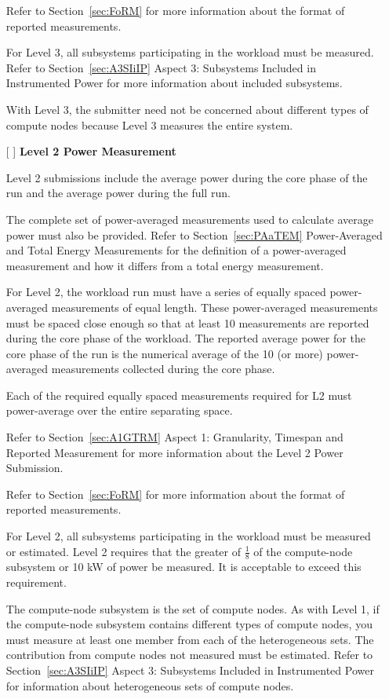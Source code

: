 \begin{itemize}
Refer to Section~\ref{sec:FoRM} for more information about the format of reported measurements.

For Level 3, all subsystems participating in the workload must be measured. Refer to 
Section~\ref{sec:A3SIiIP} Aspect 3: Subsystems Included in Instrumented Power for more information about included subsystems.

With Level 3, the submitter need not be concerned about different types of compute nodes because Level 3 measures the entire system.

\newpage
\item[{[ ]}]
\textbf{Level 2 Power Measurement}

Level 2 submissions include the average power during the core phase of the run and the average power during the full run.

The complete set of power-averaged measurements used to calculate average power must also be provided. 
Refer to Section~\ref{sec:PAaTEM} Power-Averaged and Total Energy Measurements for the definition of a power-averaged measurement and how it differs from a total energy measurement.

For Level 2, the workload run must have a series of equally spaced power-averaged measurements of equal length. These power-averaged measurements must be spaced close enough so that at least 10 measurements are reported during the core phase of the workload. The reported average power for the core phase of the run is the numerical average of the 10 (or more) power-averaged measurements collected during the core phase.

Each of the required equally spaced measurements required for L2 must power-average over the entire separating space. 

Refer to Section~\ref{sec:A1GTRM} Aspect 1: Granularity, Timespan and Reported Measurement for more information about the Level 2 Power Submission. 

Refer to Section~\ref{sec:FoRM} for more information about the format of reported measurements.

For Level 2, all subsystems participating in the workload must be measured or estimated. Level 2 requires that the 
greater of $ \frac{1}{8} $ of the compute-node subsystem or 10 kW of power be measured. It is acceptable to exceed this requirement.

The compute-node subsystem is the set of compute nodes. As with Level 1, if the compute-node subsystem contains different types of compute nodes, you must measure at least one member from each of the heterogeneous sets. The contribution from compute nodes not measured must be estimated. Refer to Section~\ref{sec:A3SIiIP} Aspect 3: Subsystems Included in Instrumented Power for information about heterogeneous sets of compute nodes.



\end{itemize}
